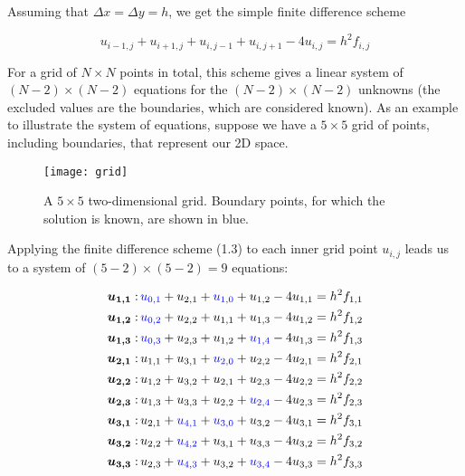 \documentclass[11pt]{report}
\begin{document}
Assuming that $\Delta x = \Delta y = h$, we get the simple finite difference scheme

\begin{equation}
u_{i-1,j} + u_{i+1,j} + u_{i,j-1} + u_{i,j+1} - 4u_{i,j} = h^2 f_{i,j}
\end{equation}

For a grid of $N \times N$ points in total, this scheme gives a linear system of $(N-2) \times (N-2)$ equations for the $(N-2) \times (N-2)$ unknowns (the excluded values are the boundaries, which are considered known). As an example to illustrate the system of equations, suppose we have a $5 \times 5$ grid of points, including boundaries, that represent our 2D space. 

\begin{figure}[h]
\centering
\texttt{[image: grid]}
\caption{A $5 \times 5$ two-dimensional grid. 
Boundary points, for which the solution is known, are shown in blue. }
\label{fig:Space grid 5x5}
\end{figure}

Applying the finite difference scheme (1.3) to each inner grid point $u_{i,j}$ leads us to a system of $(5-2) \times (5-2) = 9$ equations:

\begin{subequations}
\begin{align}
\bm{u_{1,1}}: 
\thinspace  & \textcolor{blue}{u_{0,1}} + u_{2,1} + \textcolor{blue}{u_{1,0}} + u_{1,2} - 4u_{1,1} = h^2 f_{1,1} \\
\bm{u_{1,2}}: 
\thinspace  & \textcolor{blue}{u_{0,2}} + u_{2,2} + u_{1,1} + u_{1,3} - 4u_{1,2} = h^2 f_{1,2} \\
\bm{u_{1,3}}: 
\thinspace  & \textcolor{blue}{u_{0,3}} + u_{2,3} + u_{1,2} + \textcolor{blue}{u_{1,4}} - 4u_{1,3} = h^2 f_{1,3} \\
\bm{u_{2,1}}: 
\thinspace  & u_{1,1} + u_{3,1} + \textcolor{blue}{u_{2,0}} + u_{2,2} - 4u_{2,1} = h^2 f_{2,1} \\
\bm{u_{2,2}}:
\thinspace  & u_{1,2} + u_{3,2} + u_{2,1} + u_{2,3} - 4u_{2,2} = h^2 f_{2,2} \\
\bm{u_{2,3}}: 
\thinspace  & u_{1,3} + u_{3,3} + u_{2,2} + \textcolor{blue}{u_{2,4}} - 4u_{2,3} = h^2 f_{2,3} \\
\bm{u_{3,1}}: 
\thinspace  & u_{2,1} + \textcolor{blue}{u_{4,1}} + \textcolor{blue}{u_{3,0}} + u_{3,2} - 4u_{3,1} = h^2 f_{3,1} \\
\bm{u_{3,2}}: 
\thinspace  & u_{2,2} + \textcolor{blue}{u_{4,2}} + u_{3,1} + u_{3,3} - 4u_{3,2} = h^2 f_{3,2} \\
\bm{u_{3,3}}: 
\thinspace  & u_{2,3} + \textcolor{blue}{u_{4,3}} + u_{3,2} + \textcolor{blue}{u_{3,4}} - 4u_{3,3} = h^2 f_{3,3}
\end{align}
\end{subequations}
\end{document}
